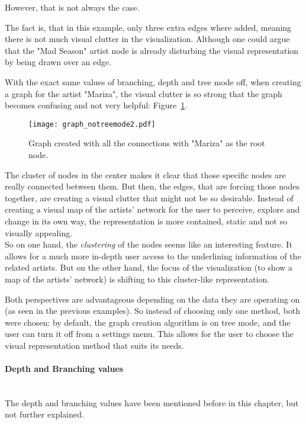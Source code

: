       However, that is not always the case.

      The fact is, that in this example, only three extra edges where added, meaning there is not much visual clutter in the visualization.
      Although one could argue that the "Mad Season" artist node is already disturbing the visual representation by being drawn over an edge.

      With the exact same values of branching, depth and tree mode off, when creating a graph for the artist "Mariza", the visual clutter is so strong that the graph becomes confusing and not very helpful: Figure~\ref{fig:graph_notreemode2}.

      \begin{figure}[tb]
        \begin{center}
          \texttt{[image: graph\_notreemode2.pdf]}
        \end{center}
        \caption{Graph created with all the connections with "Mariza" as the root node.}
        \label{fig:graph_notreemode2}
      \end{figure}

      The cluster of nodes in the center makes it clear that those specific nodes are really connected between them. 
      But then, the edges, that are forcing those nodes together, are creating a visual clutter that might not be so desirable.
      Instead of creating a visual map of the artists' network for the user to perceive, explore and change in its own way, the representation is more contained, static and not so visually appealing.
      \hfill \\

      So on one hand, the \emph{clustering} of the nodes seems like an interesting feature.
      It allows for a much more in-depth user access to the underlining information of the related artists.
      But on the other hand, the focus of the visualization (to show a map of the artists' network) is shifting to this cluster-like representation.

      Both perspectives are advantageous depending on the data they are operating on (as seen in the previous examples).
      So instead of choosing only one method, both were chosen: by default, the graph creation algorithm is on tree mode, and the user can turn it off from a settings menu.
      This allows for the user to choose the visual representation method that suits its needs.

      \paragraph{Depth and Branching values} \hfill \\
      The depth and branching values have been mentioned before in this chapter, but not further explained.


